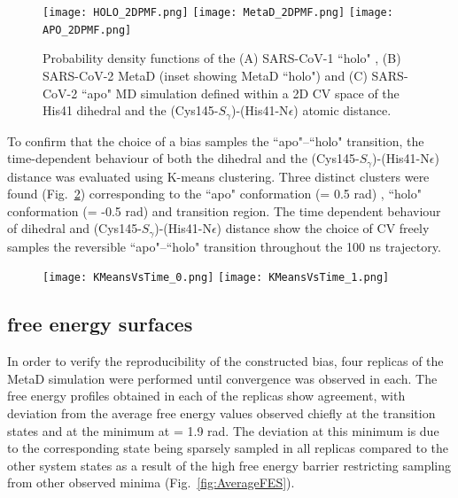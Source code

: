 \begin{figure}[ht!]
  \centering
    \texttt{[image: HOLO\_2DPMF.png]}
    \texttt{[image: MetaD\_2DPMF.png]}
    \texttt{[image: APO\_2DPMF.png]}
  \caption{Probability density functions of the (A) SARS-CoV-1 ``holo" , (B) SARS-CoV-2 MetaD (inset showing MetaD ``holo") and (C) SARS-CoV-2 ``apo" MD simulation defined within a 2D CV space of the His41 \dihtwo dihedral and the (Cys145-$S_{\gamma}$)-(His41-N{$\epsilon$}) atomic distance.}
  \label{fig:2DPMF}
\end{figure}


To confirm that the choice of a \dihone bias samples the ``apo"--``holo" transition, the time-dependent behaviour of both the \dihtwo dihedral and the (Cys145-$S_{\gamma}$)-(His41-N{$\epsilon$}) distance was evaluated using K-means clustering.\cite{scikit-learn} Three distinct clusters were found (Fig.~\ref{fig:2DAveragePMF}) corresponding to the ``apo" conformation (\dihtwo = 0.5 rad) , ``holo" conformation (\dihtwo = -0.5 rad) and transition region. The time dependent behaviour of \dihtwo dihedral and (Cys145-$S_{\gamma}$)-(His41-N{$\epsilon$}) distance show the choice of CV freely samples the reversible ``apo"--``holo" transition throughout the 100 ns trajectory.\\

\begin{figure}[!ht]
    \centering
    \texttt{[image: KMeansVsTime\_0.png]}
    \texttt{[image: KMeansVsTime\_1.png]}
    \caption{}
    \label{fig:2DAveragePMF}
\end{figure}

\subsection{ free energy surfaces}

In order to verify the reproducibility of the constructed bias, four replicas of the MetaD simulation were performed until convergence was observed in each. The free energy profiles obtained in each of the replicas show agreement, with deviation from the average free energy values observed chiefly at the transition states and at the minimum at \dihone = 1.9 rad. The deviation at this minimum is due to the corresponding state being sparsely sampled in all replicas compared to the other system states as a result of the high free energy barrier restricting sampling from other observed minima (Fig.~\ref{fig:AverageFES}).\\

